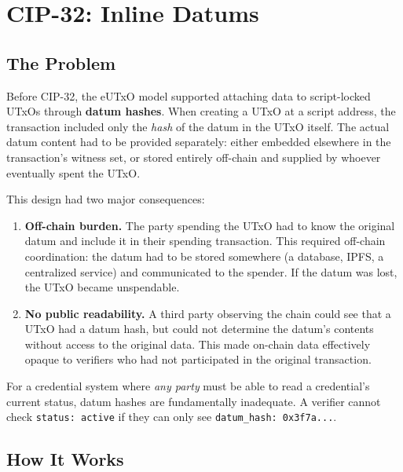 \section{CIP-32: Inline Datums}
\label{sec:cip32}

\subsection{The Problem}

Before CIP-32, the eUTxO model supported attaching data to script-locked
UTxOs through \textbf{datum hashes}.  When creating a UTxO at a script
address, the transaction included only the \emph{hash} of the datum in the
UTxO itself.  The actual datum content had to be provided separately: either
embedded elsewhere in the transaction's witness set, or stored entirely
off-chain and supplied by whoever eventually spent the UTxO.

This design had two major consequences:

\begin{enumerate}[nosep]
  \item \textbf{Off-chain burden.}  The party spending the UTxO had to know
    the original datum and include it in their spending transaction.  This
    required off-chain coordination: the datum had to be stored somewhere
    (a database, IPFS, a centralized service) and communicated to the
    spender.  If the datum was lost, the UTxO became unspendable.
  \item \textbf{No public readability.}  A third party observing the chain
    could see that a UTxO had a datum hash, but could not determine the
    datum's contents without access to the original data.  This made on-chain
    data effectively opaque to verifiers who had not participated in the
    original transaction.
\end{enumerate}

For a credential system where \emph{any party} must be able to read a
credential's current status, datum hashes are fundamentally inadequate.  A
verifier cannot check \texttt{status: active} if they can only see
\texttt{datum\_hash: 0x3f7a...}.

\subsection{How It Works}

